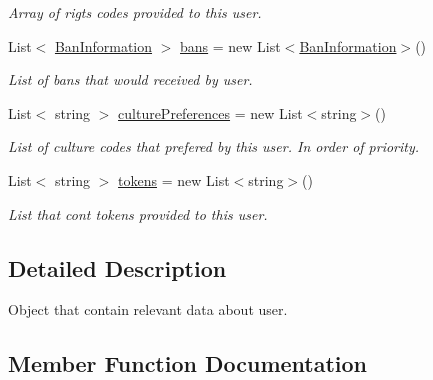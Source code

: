 \begin{DoxyCompactItemize}
\begin{DoxyCompactList}\small\item\em Array of rigts\textquotesingle{} codes provided to this user. \end{DoxyCompactList}\item 
List$<$ \mbox{\hyperlink{struct_authority_controller_1_1_data_1_1_personal_1_1_ban_information}{Ban\+Information}} $>$ \mbox{\hyperlink{class_authority_controller_1_1_data_1_1_personal_1_1_user_aba2ff03e67ecf1732c4bdb625b441aac}{bans}} = new List$<$\mbox{\hyperlink{struct_authority_controller_1_1_data_1_1_personal_1_1_ban_information}{Ban\+Information}}$>$()
\begin{DoxyCompactList}\small\item\em List of bans that would received by user. \end{DoxyCompactList}\item 
List$<$ string $>$ \mbox{\hyperlink{class_authority_controller_1_1_data_1_1_personal_1_1_user_a03e95a08b53368aa266c83327f0654b4}{culture\+Preferences}} = new List$<$string$>$()
\begin{DoxyCompactList}\small\item\em List of culture codes that prefered by this user. In order of priority. \end{DoxyCompactList}\item 
List$<$ string $>$ \mbox{\hyperlink{class_authority_controller_1_1_data_1_1_personal_1_1_user_a2d4cda1ba0e47546cc1d1b2c5db82434}{tokens}} = new List$<$string$>$()
\begin{DoxyCompactList}\small\item\em List that cont tokens provided to this user. \end{DoxyCompactList}\end{DoxyCompactItemize}


\subsection{Detailed Description}
Object that contain relevant data about user. 



\subsection{Member Function Documentation}
\mbox{\label{class_authority_controller_1_1_data_1_1_personal_1_1_user_a3acdb952f59613bae8bf253a3cada496}} 
